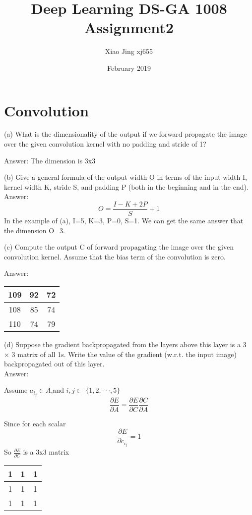 \documentclass{article}
\title{Deep Learning DS-GA 1008  Assignment2}
\author{Xiao Jing xj655}
\date{February 2019}
\begin{document}
\maketitle

\section{Convolution}
\item (a)
What is the dimensionality of the output if we forward propagate the image over the given convolution kernel with no padding and stride of 1?

Answer: The dimension is 3x3 \\

\item (b)
Give a general formula of the output width O in terms of the input width I, kernel width K, stride S, and padding P (both in the beginning and in the end).\\

Answer:
$$
O = \frac{I-K+2P}{S} +1
$$
In the example of (a), I=5, K=3, P=0, S=1.
We can get the same answer that the dimension O=3.\\

\item (c)
Compute the output C of forward propagating the image over the given convolution kernel. Assume that the bias term of the convolution is zero.

Answer:\\

\begin{tabular}{|c |c| c|}
     \hline
      109	& 92 & 72\\
      \hline
       108	& 85 & 74\\
       \hline
        110	& 74 & 79\\
        \hline
\end{tabular}

\item (d) 
Suppose the gradient backpropagated from the layers above this layer is a 3 × 3 matrix of all 1s. Write the value of the gradient (w.r.t. the input image) backpropagated out of this layer.\\

Answer:

Assume $a_i_j\in A$,and $i,j\in$  $\{1,2,\cdot\cdot\cdot,5\}$
$$
\frac{\partial E}{\partial A} = \frac{\partial E}{\partial C}\frac{\partial C}{\partial A}
$$

Since for each scalar
$$
\frac{\partial E}{\partial c_i_j} = 1
$$
So $\frac{\partial E}{\partial C}$ is a 3x3 matrix\\
\begin{tabular}{|c |c| c|}
     \hline
       1 & 1 & 1\\
      \hline
       1 & 1 & 1\\
       \hline
       1 & 1& 1 \\
        \hline
\end{tabular}\\
\end{document}
